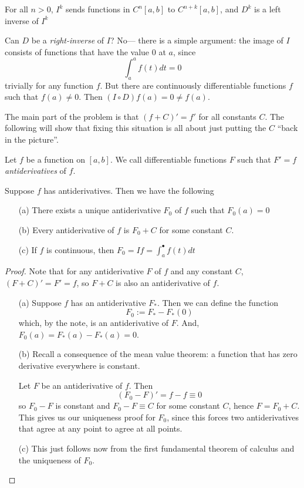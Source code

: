 \documentclass{article}
\begin{document}
\begin{corollary}
    For all $n > 0$, $I^k$ sends functions in $C^n[a,b]$ to $C^{n+k}[a,b]$, and $D^k$ is a left inverse of $I^k$
\end{corollary}

Can $D$ be a \emph{right-inverse} of $I$? No--- there is a simple argument: the image of $I$ consists of functions that have the value $0$ at $a$, since
\[
    \int_a^a f(t)dt = 0
\]
trivially for any function $f$. But there are continuously differentiable functions $f$ such that $f(a) \neq 0$. Then $(I \circ D)f(a) = 0 \neq f(a)$. 

The main part of the problem is that $(f+C)' = f'$ for all constants $C$. The following will show that fixing this situation is all about just putting the $C$ ``back in the picture''.

\begin{lemma}
    Let $f$ be a function on $[a, b]$. We call differentiable functions $F$ such that $F' = f$ \emph{antiderivatives} of $f$.

    Suppose $f$ has antiderivatives. Then we have the following
    \begin{itemize}
        \item[(a)] There exists a unique antiderivative $F_0$ of $f$ such that $F_0(a) = 0$
        \item[(b)] Every antiderivative of $f$ is $F_0 + C$ for some constant $C$.
        \item[(c)] If $f$ is continuous, then $F_0 = If = \displaystyle \int_a^\bullet f(t)dt$
    \end{itemize}
\end{lemma}

\begin{proof}
    Note that for any antiderivative $F$ of $f$ and any constant $C$, $(F+C)' = F' = f$, so $F+C$ is also an antiderivative of $f$.

    \begin{itemize}
        \item[(a)] Suppose $f$ has an antiderivative $F_\ast$. Then we can define the function
        \[
            F_0 := F_\ast - F_\ast(0)
        \]
        which, by the note, is an antiderivative of $F$. And, $F_0(a) = F_\ast(a) - F_\ast(a) = 0$.
        \item[(b)] Recall a consequence of the mean value theorem: a function that has zero derivative everywhere is constant.

        Let $F$ be an antiderivative of $f$. Then
        \[
            (F_0 - F)' = f - f \equiv 0
        \]
        so $F_0 - F$ is constant and $F_0-F \equiv C$ for some constant $C$, hence $F = F_0 + C$. This gives us our uniqueness proof for $F_0$, since this forces two antiderivatives that agree at any point to agree at all points.
    \item[(c)] This just follows now from the first fundamental theorem of calculus and the uniqueness of $F_0$.
    \end{itemize}
\end{proof}
\end{document}
